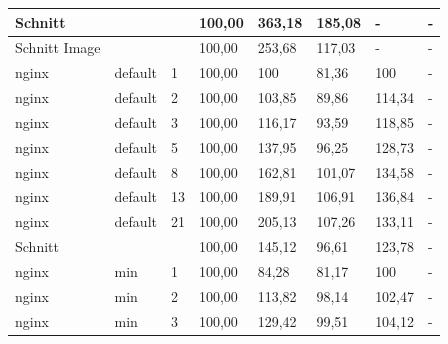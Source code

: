 \begin{footnotesize}
\begin{longtable}{llllllll}
		Schnitt        &         &            & 100,00 & 363,18                      & 185,08                      & -                           & -                           \\ \hline
		Schnitt Image  &         &            & 100,00 & 253,68                      & 117,03                      & -                           & -                           \\ \hline
		nginx          & default & 1          & 100,00 & \cellcolor[HTML]{C0C0C0}100 & 81,36                       & \cellcolor[HTML]{C0C0C0}100 & -                           \\
		nginx          & default & 2          & 100,00 & 103,85                      & 89,86                       & 114,34                      & -                           \\
		nginx          & default & 3          & 100,00 & 116,17                      & 93,59                       & 118,85                      & -                           \\
		nginx          & default & 5          & 100,00 & 137,95                      & 96,25                       & 128,73                      & -                           \\
		nginx          & default & 8          & 100,00 & 162,81                      & 101,07                      & 134,58                      & -                           \\
		nginx          & default & 13         & 100,00 & 189,91                      & 106,91                      & 136,84                      & -                           \\
		nginx          & default & 21         & 100,00 & 205,13                      & 107,26                      & 133,11                      & -                           \\ \hline
		Schnitt        &         &            & 100,00 & 145,12                      & 96,61                       & 123,78                      & -                           \\ \hline
		nginx          & min     & 1          & 100,00 & 84,28                       & 81,17                       & \cellcolor[HTML]{C0C0C0}100 & -                           \\
		nginx          & min     & 2          & 100,00 & 113,82                      & 98,14                       & 102,47                      & -                           \\
		nginx          & min     & 3          & 100,00 & 129,42                      & 99,51                       & 104,12                      & -                           \\

\end{longtable}
\end{footnotesize}
